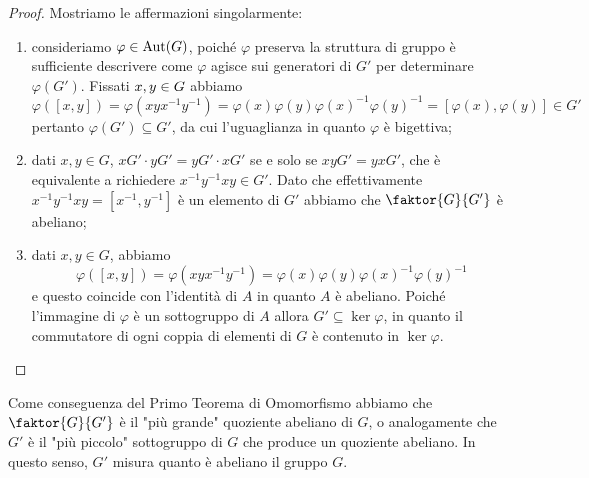 \documentclass[11pt]{scrartcl}
\begin{document}
\begin{proof}
    Mostriamo le affermazioni singolarmente:
    \begin{enumerate}[(1)]
        \item consideriamo $\varphi \in \operatorname{Aut}(G)$, poiché $\varphi$ preserva la struttura
        di gruppo è sufficiente descrivere come $\varphi$ agisce sui 
        generatori di $G'$ per determinare $\varphi(G')$. 
        Fissati $x, y \in\nolinebreak G$ abbiamo 
        \[
            \varphi([x, y]) = \varphi(xyx^{-1}y^{-1}) = \varphi(x)\varphi(y)
            \varphi(x)^{-1}\varphi(y)^{-1} = [\varphi(x), \varphi(y)] \in G'
        \]pertanto $\varphi(G') \subseteq G'$, da cui l'uguaglianza in quanto 
        $\varphi$ è bigettiva;
        \item dati $x, y \in G$, $xG'\cdot yG' = yG'\cdot xG'$ se e solo se 
        $xyG' = yxG'$, che è equivalente a richiedere $x^{-1}y^{-1}xy \in G'$. 
        Dato che effettivamente $x^{-1}y^{-1}xy = [x^{-1}, y^{-1}]$ è un elemento di $G'$
        abbiamo che $\faktor{G}{G'}$ è abeliano;
        \item dati $x, y \in G$, abbiamo 
        \[
            \varphi([x, y]) = \varphi(xyx^{-1}y^{-1}) = 
        \varphi(x)\varphi(y)\varphi(x)^{-1}\varphi(y)^{-1}
        \]
        e questo coincide con
        l'identità di $A$ in quanto $A$ è abeliano. Poiché l'immagine di $\varphi$
        è un sottogruppo di $A$ allora $G' \subseteq \ker\varphi$, in quanto
        il commutatore di ogni coppia di elementi di $G$ è contenuto in $\ker \varphi$.
    \end{enumerate}
\end{proof}

\begin{remark}
    Come conseguenza del Primo Teorema di Omomorfismo abbiamo che $\faktor{G}{G'}$ è 
    il "più grande" quoziente abeliano di $G$, o analogamente che 
    $G'$ è il "più piccolo" sottogruppo di $G$ che produce un quoziente abeliano.
    In questo senso, $G'$ misura quanto è abeliano il gruppo $G$.
\end{remark}
\end{document}
